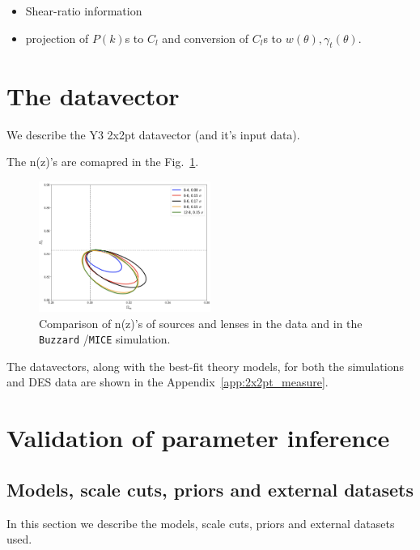 \documentclass[fleqn,usenatbib]{mnras}
\newcommand{\mice}{\texttt{MICE} }
\newcommand{\buzzard}{\texttt{Buzzard} }
\begin{document}
    

\begin{itemize}
    \item Shear-ratio information
    
    \item projection of $P(k)$s to $C_l$ and conversion of $C_l$s to $w(\theta),\gamma_t(\theta)$.
\end{itemize}



\section{The datavector}
We describe the Y3 2x2pt datavector (and it's input data).

The n(z)'s are comapred in the Fig.~\ref{fig:nz_comp}.

\begin{figure}
\includegraphics[width=0.5\textwidth,draft]{figs/temp.png}
\caption[]{Comparison of n(z)'s of sources and lenses in the data and in the \buzzard/\mice simulation. }
\label{fig:nz_comp}
\end{figure}

The datavectors, along with the best-fit theory models, for both the simulations and DES data are shown in the Appendix~\ref{app:2x2pt_measure}. 

\section{Validation of parameter inference}

\subsection{Models, scale cuts, priors and external datasets}
In this section we describe the models, scale cuts, priors and external datasets used.
\end{document}
